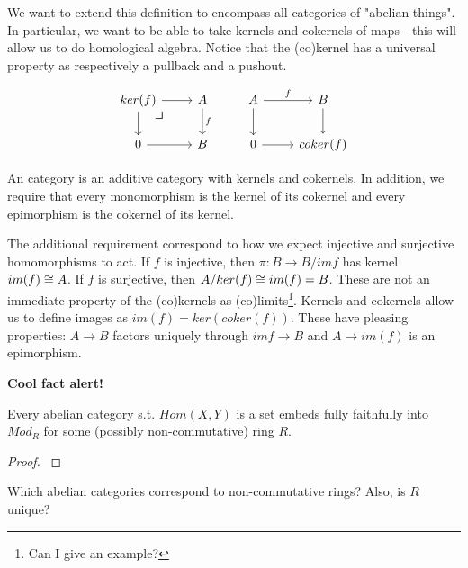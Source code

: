 We want to extend this definition to encompass all categories of "abelian things". In particular, we want to be able to take kernels and cokernels of maps - this will allow us to do homological algebra. Notice that the (co)kernel has a universal property as respectively a pullback and a pushout.

\[\begin{tikzcd}
ker(f) \pullback
\arrow[r] \arrow[d] & A \arrow[d, "f"] & A \arrow[r, "f"] \arrow[d] & B \arrow[d] \\
0 \arrow[r]                & B                & 0 \arrow[r]                & coker(f)   
\end{tikzcd}\]

\begin{definition}
An  category is an additive category with kernels and cokernels. In addition, we require that every monomorphism is the kernel of its cokernel and every epimorphism is the cokernel of its kernel.
\end{definition}
The additional requirement correspond to how we expect injective and surjective homomorphisms to act. If $f$ is injective, then $\pi:B\rightarrow B/im f$ has kernel $im(f)\cong A$. If $f$ is surjective, then $A/ker(f)\cong im(f)=B$. These are not an immediate property of the (co)kernels as (co)limits\footnote{Can I give an example?}. Kernels and cokernels allow us to define images as $im(f)=ker(coker(f))$. These have pleasing properties: $A\rightarrow B$ factors uniquely through $imf\rightarrow B$ and $A\rightarrow im(f)$ is an epimorphism.

\textbf{Cool fact alert!}
\begin{theorem}
Every abelian category s.t. $Hom(X,Y)$ is a set embeds fully faithfully into $Mod_R$ for some (possibly non-commutative) ring $R$.
\end{theorem}
\begin{proof}
\cite{Weibel}
\end{proof}
Which abelian categories correspond to non-commutative rings? Also, is $R$ unique?

